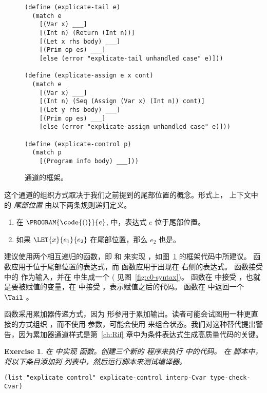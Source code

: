 \documentclass[11pt]{book}
\newtheorem{exercise}[theorem]{Exercise}
\begin{document}
\begin{figure}[tbp]
\begin{lstlisting}
(define (explicate-tail e)
  (match e
    [(Var x) ___]
    [(Int n) (Return (Int n))]
    [(Let x rhs body) ___]
    [(Prim op es) ___]
    [else (error "explicate-tail unhandled case" e)]))

(define (explicate-assign e x cont)
  (match e
    [(Var x) ___]
    [(Int n) (Seq (Assign (Var x) (Int n)) cont)]
    [(Let y rhs body) ___]
    [(Prim op es) ___]
    [else (error "explicate-assign unhandled case" e)]))

(define (explicate-control p)
  (match p
    [(Program info body) ___]))
\end{lstlisting}
\caption{  通道的框架。}
\label{fig:explicate-control-Rvar}
\end{figure}

这个通道的组织方式取决于我们之前提到的尾部位置的概念。形式上， \LangVar{} 上下文中的 \emph{尾部位置} 由以下两条规则递归定义。
\begin{enumerate}
\item 在 $\PROGRAM{\code{()}}{e}$, 中，表达式 $e$ 位于尾部位置。
\item 如果 $\LET{x}{e_1}{e_2}$ 在尾部位置，那么 $e_2$ 也是。
\end{enumerate}

建议使用两个相互递归的函数，即  和
 来实现  ，如图~\ref{fig:explicate-control-Rvar} 的框架代码中所建议。 
函数应用于位于尾部位置的表达式，而
 函数应用于出现在  右侧的表达式。
%
  函数接受 \LangVar{} 中的 \Exp{} 作为输入，并在 \LangCVar{} 中生成一个 \Tail{} (
见图~\ref{fig:c0-syntax})。
%
  函数在 \Exp{} 中接受 \LangVar{} ，也就是要被赋值的变量，在 \Tail{} 中接受
\LangCVar{} ，表示赋值之后的代码。
 函数在 \LangCVar{} 中返回一个 $\Tail$ 。

  函数采用累加器传递方式，因为  形参用于累加输出。读者可能会试图用一种更直接的方式组织
 ，而不使用
 参数，可能会使用  来组合状态。我们对这种替代提出警告，因为累加器通道样式是第~\ref{ch:Rif} 章中为条件表达式生成高质量代码的关键。

\begin{exercise}\normalfont
%
在  中实现  函数。创建三个新的 \LangInt{} 程序来执行  中的代码。
%
在  脚本中，将以下条目添加到  列表中，然后运行脚本来测试编译器。
\begin{lstlisting}
(list "explicate control" explicate-control interp-Cvar type-check-Cvar)  
\end{lstlisting}
\end{exercise}
\end{document}
